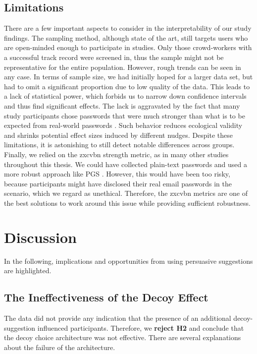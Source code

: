 \subsection{Limitations}
There are a few important aspects to consider in the interpretability of our study findings. The sampling method, although state of the art, still targets users who are open-minded enough to participate in studies. Only those crowd-workers with a successful track record were screened in, thus the sample might not be representative for the entire population. However, rough trends can be seen in any case. In terms of sample size, we had initially hoped for a larger data set, but had to omit a significant proportion due to low quality of the data. This leads to a lack of statistical power, which forbids us to narrow down confidence intervals and thus find significant effects. The lack is aggravated by the fact that many study participants chose passwords that were much stronger than what is to be expected from real-world passwords \cite{Mazurek2013Measuring}. Such behavior reduces ecological validity and shrinks potential effect sizes induced by different nudges. Despite these limitations, it is astonishing to still detect notable differences across groups. Finally, we relied on the zxcvbn strength metric, as in many other studies throughout this thesis. We could have collected plain-text passwords and used a more robust approach like PGS \cite{Ur2015MeasuringRealWorldAccuracies}. However, this would have been too risky, because participants might have disclosed their real email passwords in the scenario, which we regard as unethical. Therefore, the zxcvbn metrics are one of the best solutions to work around this issue while providing sufficient robustness.

\section{Discussion}
In the following, implications and opportunities from using persuasive suggestions are highlighted. 

\subsection{The Ineffectiveness of the Decoy Effect}
The data did not provide any indication that the presence of an additional decoy-suggestion influenced participants. Therefore, we \textbf{reject H2} and conclude that the decoy choice architecture was not effective. There are several explanations about the failure of the architecture.

